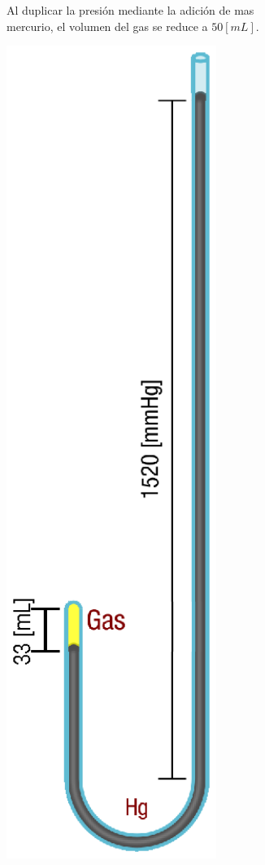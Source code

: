 \documentclass[letter,11pt]{article}
\begin{document}
\begin{figure}
\begin{subfigure}{.30\textwidth}
    \caption{Al duplicar la presión mediante la adición de mas mercurio, el
    volumen del gas se reduce a $50 [mL]$. \\
    }
    \label{figura1b}
\end{subfigure}
\hfill
\begin{subfigure}{.30\textwidth}
    \centering
    \includegraphics[width=0.75\textwidth]{resources/f1c.eps}

\end{subfigure}
\end{figure}
\end{document}

